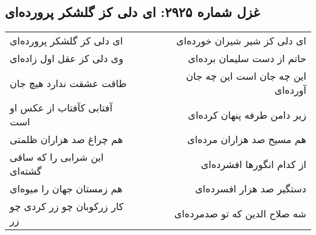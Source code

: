 \begin{center}
\section*{غزل شماره ۲۹۲۵: ای دلی کز گلشکر پرورده‌ای}
\label{sec:2925}
\begin{longtable}{l p{0.5cm} r}
ای دلی کز گلشکر پرورده‌ای
&&
ای دلی کز شیر شیران خورده‌ای
\\
وی دلی کز عقل اول زاده‌ای
&&
حاتم از دست سلیمان برده‌ای
\\
طاقت عشقت ندارد هیچ جان
&&
این چه جان است این چه جان آورده‌ای
\\
آفتابی کآفتاب از عکس او است
&&
زیر دامن طرفه پنهان کرده‌ای
\\
هم چراغ صد هزاران ظلمتی
&&
هم مسیح صد هزاران مرده‌ای
\\
این شرابی را که ساقی گشته‌ای
&&
از کدام انگورها افشرده‌ای
\\
هم زمستان جهان را میوه‌ای
&&
دستگیر صد هزار افسرده‌ای
\\
کار زرکوبان چو زر کردی چو زر
&&
شه صلاح الدین که تو صدمرده‌ای
\\
\end{longtable}
\end{center}

